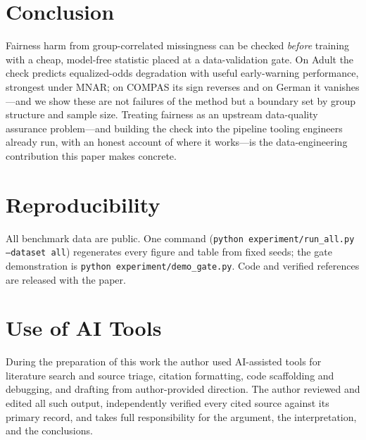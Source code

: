 \documentclass[sigconf,nonacm]{acmart}
\begin{document}
\section{Conclusion}
Fairness harm from group-correlated missingness can be checked \emph{before} training with a
cheap, model-free statistic placed at a data-validation gate. On Adult the check predicts
equalized-odds degradation with useful early-warning performance, strongest under MNAR; on COMPAS
its sign reverses and on German it vanishes---and we show these are not failures of the method but
a boundary set by group structure and sample size. Treating fairness as an upstream data-quality
assurance problem---and building the check into the pipeline tooling engineers already run, with an
honest account of where it works---is the data-engineering contribution this paper makes concrete.

\section*{Reproducibility}
All benchmark data are public. One command (\texttt{python experiment/run\_all.py --dataset
all}) regenerates every figure and table from fixed seeds; the gate demonstration is
\texttt{python experiment/demo\_gate.py}. Code and verified references are released with the
paper.

\section*{Use of AI Tools}
During the preparation of this work the author used AI-assisted tools for literature search and
source triage, citation formatting, code scaffolding and debugging, and drafting from
author-provided direction. The author reviewed and edited all such output, independently
verified every cited source against its primary record, and takes full responsibility for the
argument, the interpretation, and the conclusions.



\end{document}
